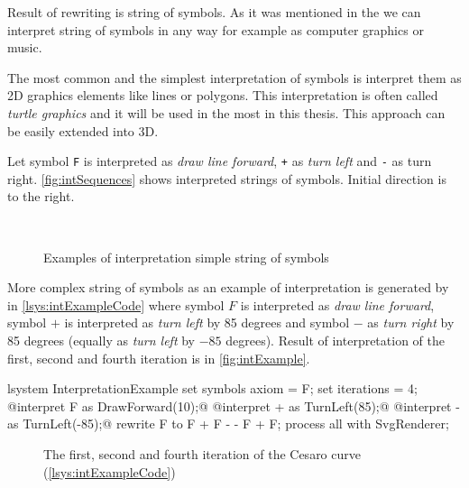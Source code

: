 Result of \lsystem rewriting is string of symbols.
As it was mentioned in the  we can interpret string of symbols in any way for example as computer graphics or music.

The most common and the simplest interpretation of \lsystem symbols is interpret them as 2D graphics elements like lines or polygons.
This interpretation is often called \emph{turtle graphics} and it will be used in the most \lsystems in this thesis.
This approach can be easily extended into 3D.

Let symbol \texttt{F} is interpreted as \emph{draw line forward}, \texttt{+} as \emph{turn left} and \texttt{-} as turn right.
\autoref{fig:intSequences} shows interpreted strings of symbols.
Initial direction is to the right.

\begin{figure}[h]
	\centering
	 ~
	 ~
	\caption{Examples of interpretation simple string of symbols}
	\label{fig:intSequences}
\end{figure}


More complex string of symbols as an example of interpretation is generated by \lsystem in \autoref{lsys:intExampleCode} where symbol $F$ is interpreted as \emph{draw line forward},
	symbol $+$ is interpreted as \emph{turn left} by 85 degrees and symbol $-$ as \emph{turn right} by 85 degrees (equally as \emph{turn left} by $-85$ degrees).
Result of interpretation of the first, second and fourth iteration is in \autoref{fig:intExample}.

\begin{Lsystem}[label=lsys:intExampleCode,caption={Symbol interpretation example}]
lsystem InterpretationExample {
	set symbols axiom = F;
	set iterations = 4;
	@interpret F as DrawForward(10);@
	@interpret + as TurnLeft(85);@
	@interpret - as TurnLeft(-85);@
	rewrite F to F + F - - F + F;
}
process all with SvgRenderer;
\end{Lsystem}

\begin{figure}[h]
	 \hfill
	 \hfill
	\caption{The first, second and fourth iteration of the Cesaro curve (\autoref{lsys:intExampleCode})}
	\label{fig:intExample}
\end{figure}

